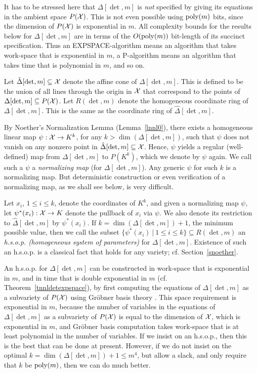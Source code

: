 \documentclass[11pt]{article}
\begin{document}
It has to be stressed here that $\Delta[\det,m]$ is {\em not} 
specified by giving its equations in the ambient space $P({\cal X})$. This is not even possible using ${\mbox {poly}}(m)$ bits, since
the dimension of $P({\cal X})$  is exponential in $m$.
All complexity bounds for the results below for $\Delta[\det,m]$ 
are in terms of the $O({\mbox {poly}}(m))$ bit-length of its
succinct specification. Thus an EXPSPACE-algorithm  means an algorithm that takes work-space that is exponential in $m$, 
a P-algorithm   means an algorithm that takes time that is polynomial  in $m$, and so on.

Let  $\hat \Delta[\det,m] \subseteq {\cal X}$ denote the affine cone of $\Delta[\det,m]$. This is defined to be
the union of all lines through the origin in ${\cal X}$ that correspond to the points of $\Delta[\det,m] \subseteq P({\cal X})$.
Let $R(\det,m)$ denote the homogeneous coordinate ring of $\Delta[\det,m]$. This is the same as  the coordinate ring
of $\hat \Delta[\det,m]$.


By Noether's Normalization Lemma (Lemma~\ref{lnnl0}), there exists a homogeneous linear map $\psi: {\cal X} \rightarrow K^k$,
for any $k> \dim(\Delta[\det,m])$, such that $\psi$ does not vanish on any nonzero point
in  $\hat \Delta[\det,m] \subseteq {\cal X}$.
Hence, $\psi$ yields a regular (well-defined) map 
from $\Delta[\det,m]$ to $P(K^k)$, which we denote by $\psi$ again.
We  call such a $\psi$ a {\em normalizing map} (for $\Delta[\det,m]$). 
Any  generic $\psi$ for such  $k$ is a normalizing 
map. But deterministic construction or even verification of a normalizing map,
as we shall see below, is very difficult.

Let $x_i$, $1 \le i \le k$,  denote the coordinates of $K^k$, and given a normalizing map $\psi$, let 
$\psi^*(x_i): {\cal X} \rightarrow K$ denote the pullback of $x_i$ via $\psi$. We also denote its restriction to  
$\hat \Delta[\det,m]$ by $\psi^*(x_i)$.
If $k=\dim(\Delta[\det,m])+1$, the minimum possible value, then we call the subset $\{\psi^*(x_i)\ | \ 1 \le i \le k\} \subseteq R(\det,m)$ 
an {\em h.s.o.p. (homogeneous system of parameters)} for $\Delta[\det,m]$.
Existence of such 
an h.s.o.p. is a classical  fact that holds for any variety; cf. 
Section~\ref{snoether}.

An h.s.o.p. for $\Delta[\det,m]$   can be constructed 
in work-space that is exponential in $m$, and in time that is double exponential in $m$ (cf. Theorem~\ref{tnnldetexpspace}),
by first computing the equations of $\Delta[\det,m]$ as a subvariety of $P({\cal X})$ using Gr\"obner basis theory \cite{mayr2}.
This space requirement is exponential in $m$, because 
the number of variables in the equations of $\Delta[\det,m]$ as a subvariety of $P({\cal X})$ is equal to the dimension of ${\cal X}$,
which is exponential in $m$, and  Gr\"obner basis computation
\cite{mayr2} takes work-space that is at least polynomial in the number of variables.
If we insist on an h.s.o.p., then this is the best that can be done at present.
However, if we do not insist on the  optimal $k=\dim(\Delta[\det,m]) +1 \le m^4$, but 
allow a slack, and only require that $k$ be ${\mbox {poly}}(m)$, then we can do much better.
\end{document}
